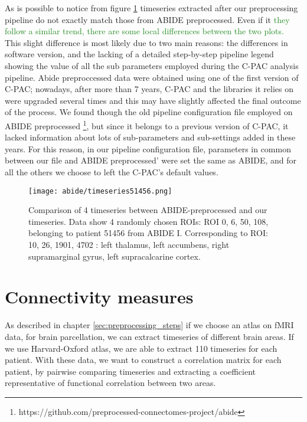 \documentclass[11pt]{report}
\begin{document}
As is possible to notice from figure \ref{fig:confrontoabidepreproc} timeseries extracted after our preprocessing pipeline do not exactly match those from ABIDE preprocessed.
Even if it \textcolor{ForestGreen}{they follow a similar trend, there are some local differences between the two plots.}
This slight difference is most likely due to two main reasons: the differences in software version, and the lacking of a detailed step-by-step pipeline legend showing the value of all the sub parameters employed during the C-PAC analysis pipeline.
Abide preproccessed data were obtained using one of the first version of C-PAC; nowadays, after more than 7 years, C-PAC and the libraries it relies on were upgraded several times and this may have slightly affected the final outcome of the process.
We found though the old pipeline configuration file employed on ABIDE preprocessed \footnote{https://github.com/preprocessed-connectomes-project/abide}, but since it belongs to a previous version of C-PAC, it lacked information about lots of sub-parameters and sub-settings added in these years.
For this reason, in our pipeline configuration file, parameters in common between our file and ABIDE preprocessed' were set the same as ABIDE, and for all the others we choose to left the C-PAC's default values.

\begin{figure}[h]
\centering
\texttt{[image: abide/timeseries51456.png]}
\caption{Comparison of 4 timeseries between ABIDE-preprocessed and our timeseries. Data show 4 randomly chosen ROIs: ROI 0, 6, 50, 108, belonging to patient 51456 from ABIDE I. Corresponding to ROI: 10, 26, 1901, 4702 : left thalamus, left accumbens, right supramarginal gyrus, left supracalcarine cortex.}
\label{fig:confrontoabidepreproc}
\end{figure}



\chapter{Connectivity measures}\label{chap:connectivity_coefficients}
As described in chapter \ref{sec:preprocessing_steps} if we choose an atlas on fMRI data, for brain parcellation, we can extract timeseries of different brain areas. If we use Harvard-Oxford atlas, we are able to extract 110 timeseries for each patient.
With these data, we want to construct a correlation matrix for each patient, by pairwise comparing timeseries and extracting a coefficient representative of functional correlation between two areas.
\end{document}
